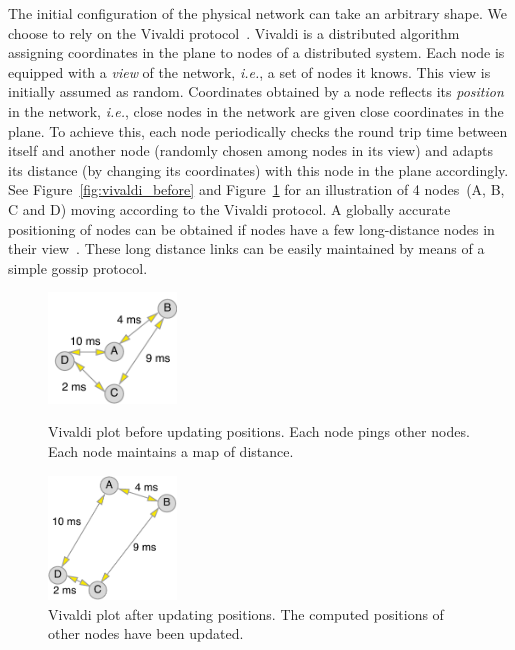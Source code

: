 The initial configuration of the physical network can take an arbitrary
shape. We choose to rely on the Vivaldi
protocol~\cite{dabek:2001:sigcomm04}. Vivaldi is a distributed algorithm
assigning coordinates in the plane to nodes of a distributed system. Each node
is equipped with a \emph{view} of the network, \emph{i.e.}, a set of nodes it
knows. This view is initially assumed as random. Coordinates obtained by a node
reflects its \emph{position} in the network, \emph{i.e.}, close nodes in the
network are given close coordinates in the plane. To achieve this, each node
periodically checks the round trip time between itself and another node
(randomly chosen among nodes in its view) and adapts its distance (by changing
its coordinates) with this node in the plane accordingly. See
Figure~\ref{fig:vivaldi_before} and Figure~\ref{fig:vivaldi_after} for an
illustration of 4 nodes~(A, B, C and D) moving according to the Vivaldi
protocol. 
%
A globally accurate positioning of nodes can be
obtained if nodes have a few long-distance nodes in their
view~\cite{dabek:2001:sigcomm04}. These long distance links can be easily
maintained by means of a simple gossip protocol.

\begin{figure}[!b]
	\vspace*{-.3cm}
  \begin{minipage}[c]{.45\linewidth}
   \hspace*{-0.5cm}
      	\centering \includegraphics[width=3.4cm]{./FIGS/vivaldi_before.pdf}

   \hspace*{0.5cm}
		\caption{Vivaldi plot before updating positions. Each node pings other nodes. Each node maintains a map of distance.}
\label{fig:vivaldi_before}
   \end{minipage}
\hspace*{0.6cm}
   \begin{minipage}[c]{.45\linewidth}
   	\centering \includegraphics[width=3.4cm]{./FIGS/vivaldi_after.pdf}
		\caption{Vivaldi plot after updating positions. The computed
                  positions of other nodes have been updated.}
		\label{fig:vivaldi_after} 
  \end{minipage} \hfill
\end{figure}


